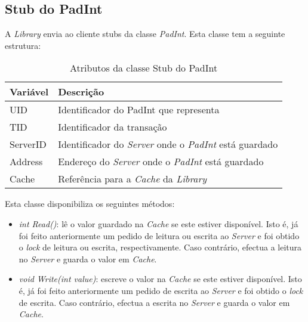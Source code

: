 \subsection{Stub do PadInt}
\label{Stub do PadInt}

A \textit{Library} envia ao cliente stubs da classe \textit{PadInt}. Esta classe tem a seguinte estrutura:

\begin{table}[H]
\centering
\begin{tabular}{| p{2cm} | p{} |}
\hline
\textbf{Variável} & \textbf{Descrição} \\
\hline
UID & Identificador do PadInt que representa \\
\hline
TID & Identificador da transação \\
\hline
ServerID & Identificador do \textit{Server} onde o \textit{PadInt} está guardado \\
\hline
Address & Endereço do \textit{Server} onde o \textit{PadInt} está guardado \\
\hline
Cache & Referência para a  \textit{Cache} da \textit{Library} \\
\hline
\end{tabular}
\caption{Atributos da classe Stub do PadInt}
\end{table}

Esta classe disponibiliza os seguintes métodos:

\begin{itemize}
	\item \textit{int Read()}: lê o valor guardado na \textit{Cache} se este estiver disponível. Isto é, já foi feito anteriormente um pedido de leitura ou escrita ao \textit{Server} e foi obtido o \textit{lock} de leitura ou escrita, respectivamente. Caso contrário, efectua a leitura no \textit{Server} e guarda o valor em \textit{Cache}.
	\item \textit{void Write(int value)}: escreve o valor na \textit{Cache} se este estiver disponível. Isto é, já foi feito anteriormente um pedido de escrita ao \textit{Server} e foi obtido o \textit{lock} de escrita. Caso contrário, efectua a escrita no \textit{Server} e guarda o valor em \textit{Cache}.
\end{itemize}